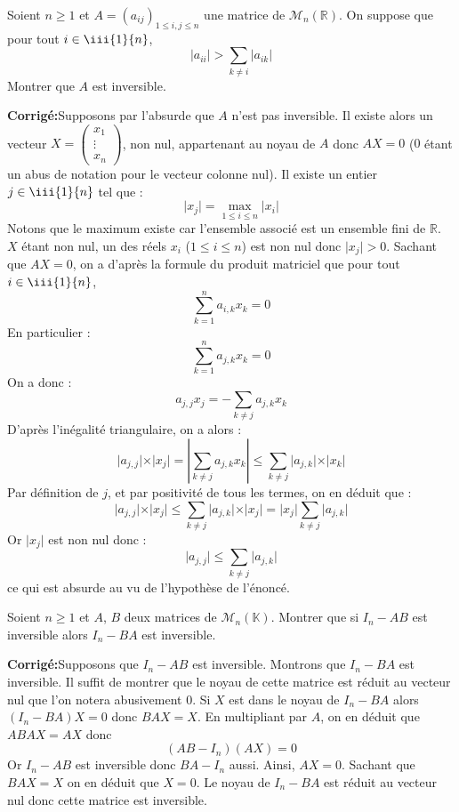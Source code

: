 \documentclass[a4paper,twoside,french,11pt]{VcCours}
\newcommand{\corr}{\textbf{Corrigé:}}
\begin{document}
 \begin{Exercice}{} Soient $n \geq 1$ et $A = (a_{ij})_{1 \leq i,j \leq n}$ une matrice de $\mathcal{M}_n(\mathbb{R})$. On suppose que pour tout $i \in \iii{1}{n}$,
$$ \vert a_{ii} \vert > \sum_{k \neq i} \vert a_{ik} \vert $$
Montrer que $A$ est inversible.
\end{Exercice}

\corr Supposons par l'absurde que $A$ n'est pas inversible. Il existe alors un vecteur $X = \begin{pmatrix}
x_1 \\
\vdots \\
x_n
\end{pmatrix}$, non nul, appartenant au noyau de $A$ donc $AX= 0$ ($0$ étant un abus de notation pour le vecteur colonne nul). Il existe un entier $j \in \iii{1}{n}$ tel que :
$$ \vert x_j \vert = \max_{1 \leq i \leq n} \vert x_i \vert$$
Notons que le maximum existe car l'ensemble associé est un ensemble fini de $\mathbb{R}$. $X$ étant non nul, un des réels $x_i$ ($1 \leq i \leq n$) est non nul donc $\vert x_j \vert >0$. Sachant que $AX=0$, on a d'après la formule du produit matriciel que pour tout $i \in \iii{1}{n}$,
$$ \sum_{k=1}^n a_{i,k} x_k = 0$$
En particulier :
$$ \sum_{k=1}^n a_{j,k} x_k = 0$$
On a donc :
$$ a_{j,j} x_j = - \sum_{k \neq j} a_{j,k} x_k$$
D'après l'inégalité triangulaire, on a alors :
$$ \vert a_{j,j} \vert \times \vert x_j \vert = \left\vert  \sum_{k \neq j} a_{j,k} x_k \right\vert \leq \sum_{k \neq j} \vert a_{j,k} \vert \times \vert x_k \vert$$
Par définition de $j$, et par positivité de tous les termes, on en déduit que :
$$  \vert a_{j,j} \vert \times \vert x_j \vert \leq \sum_{k \neq j} \vert a_{j,k} \vert \times \vert x_j \vert =  \vert x_j \vert\sum_{k \neq j} \vert a_{j,k} \vert$$
Or $\vert x_j \vert$ est non nul donc :
$$ \vert a_{j,j} \vert  \leq  \sum_{k \neq j} \vert a_{j,k} \vert$$
ce qui est absurde au vu de l'hypothèse de l'énoncé.



\begin{Exercice}{} Soient $n\geq 1$ et $A$, $B$ deux matrices de $\mathcal{M}_n(\mathbb{K})$. Montrer que si $I_n - AB$ est inversible alors $I_n - BA$ est inversible.
\end{Exercice} 

\corr Supposons que $I_n -AB$ est inversible. Montrons que $I_n-BA$ est inversible. Il suffit de montrer que le noyau de cette matrice est réduit au vecteur nul que l'on notera abusivement $0$. Si $X$ est dans le noyau de $I_n-BA$ alors $(I_n- BA)X=0$ donc $BAX=X$. En multipliant par $A$, on en déduit que $ABAX=AX$ donc 
$$ (AB-I_n)(AX)=0$$
Or $I_n -AB$ est inversible donc $BA-I_n$ aussi. Ainsi, $AX=0$. Sachant que $BAX=X$ on en déduit que $X=0$. Le noyau de $I_n-BA$ est réduit au vecteur nul donc cette matrice est inversible.
\end{document}

